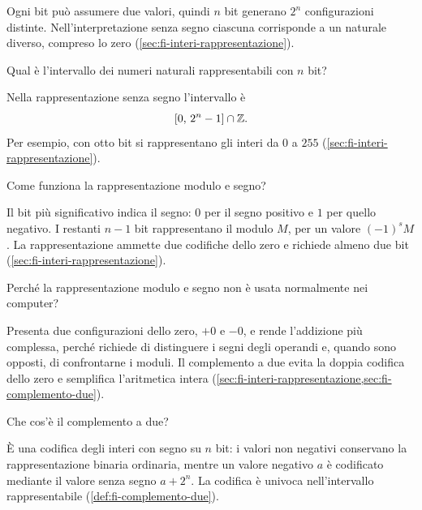 Ogni bit può assumere due valori, quindi \(n\) bit generano
\(2^n\) configurazioni distinte. Nell'interpretazione senza segno
ciascuna corrisponde a un naturale diverso, compreso lo zero
(\cref{sec:fi-interi-rappresentazione}).

\begin{exercise}
\label{ex:fi-rappresentazione-intervallo-senza-segno}
Qual è l'intervallo dei numeri naturali rappresentabili con \(n\) bit?
\end{exercise}

Nella rappresentazione senza segno l'intervallo è
\[
  [0,\,2^n-1]\cap\mathbb{Z}.
\]
Per esempio, con otto bit si rappresentano gli interi da \(0\) a
\(255\) (\cref{sec:fi-interi-rappresentazione}).

\begin{exercise}
\label{ex:fi-rappresentazione-modulo-segno}
Come funziona la rappresentazione modulo e segno?
\end{exercise}

Il bit più significativo indica il segno: \(0\) per il segno
positivo e \(1\) per quello negativo. I restanti \(n-1\) bit
rappresentano il modulo \(M\), per un valore \((-1)^sM\).
La rappresentazione ammette due codifiche dello zero e richiede
almeno due bit
(\cref{sec:fi-interi-rappresentazione}).

\begin{exercise}
\label{ex:fi-rappresentazione-limiti-modulo-segno}
Perché la rappresentazione modulo e segno non è usata normalmente
nei computer?
\end{exercise}

Presenta due configurazioni dello zero, \(+0\) e \(-0\), e rende
l'addizione più complessa, perché richiede di distinguere i segni
degli operandi e, quando sono opposti, di confrontarne i moduli.
Il complemento a due evita la doppia codifica dello zero e semplifica
l'aritmetica intera (\cref{sec:fi-interi-rappresentazione,sec:fi-complemento-due}).

\begin{exercise}
\label{ex:fi-rappresentazione-definizione-complemento-due}
Che cos'è il complemento a due?
\end{exercise}

È una codifica degli interi con segno su \(n\) bit: i valori
non negativi conservano la rappresentazione binaria ordinaria,
mentre un valore negativo \(a\) è codificato mediante il valore
senza segno \(a+2^n\). La codifica è univoca nell'intervallo
rappresentabile (\cref{def:fi-complemento-due}).

